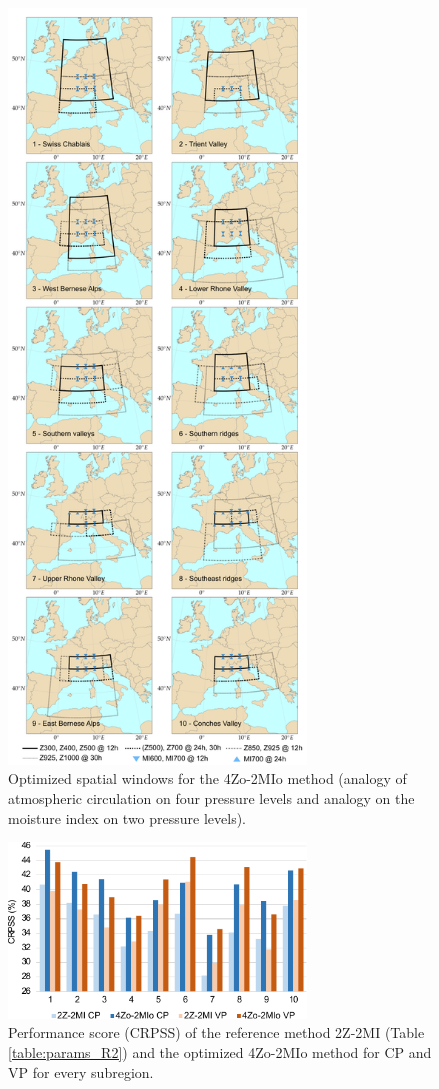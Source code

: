 \documentclass[review]{elsarticle}
\begin{document}
\begin{figure}[t]
	\centerline{\includegraphics[width=7.9cm]{fig06.pdf}}
	\caption{Optimized spatial windows for the 4Zo-2MIo method (analogy of atmospheric circulation on four pressure levels and analogy on the moisture index on two pressure levels).}
	\label{fig:spatial_windows_4Zo-2MIo}
\end{figure}

\begin{figure}[t]
	\centerline{\includegraphics[width=7.9cm]{fig07.pdf}}
	\caption{Performance score (CRPSS) of the reference method 2Z-2MI (Table \ref{table:params_R2}) and the optimized 4Zo-2MIo method for CP and VP for every subregion.}
	\label{fig:figure_crpss_4Zo-2HIo}
\end{figure}
\end{document}

